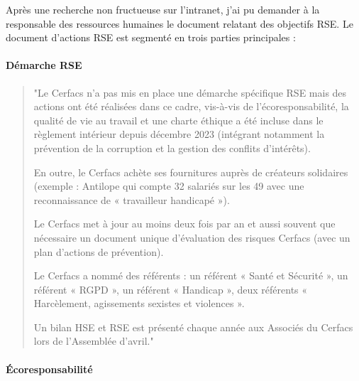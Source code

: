 

Après une recherche non fructueuse sur l'intranet, j'ai pu demander à la responsable des ressources humaines le document relatant des objectifs \ac{RSE}. Le document d'actions RSE est segmenté en trois parties principales :

\paragraph{Démarche RSE}


\begin{quote}
\setlength{\leftmargin}{0.5cm} %
\setlength{\rightmargin}{0.5cm} %
    "Le Cerfacs n’a pas mis en place une démarche spécifique RSE mais des actions ont été réalisées dans
    ce cadre, vis-à-vis de l’écoresponsabilité, la qualité de vie au travail et une charte éthique a été
    incluse dans le règlement intérieur depuis décembre 2023 (intégrant notamment la prévention de la
    corruption et la gestion des conflits d’intérêts).
    \hspace{0,5cm}

    En outre, le Cerfacs achète ses fournitures auprès de créateurs solidaires (exemple : Antilope qui
    compte 32 salariés sur les 49 avec une reconnaissance de « travailleur handicapé »).
    \hspace{0,5cm}

    Le Cerfacs met à jour au moins deux fois par an et aussi souvent que nécessaire un document unique
    d’évaluation des risques Cerfacs (avec un plan d’actions de prévention).
    \hspace{0,5cm}

    Le Cerfacs a nommé des référents : un référent « Santé et Sécurité », un référent « \ac{RGPD} », un
    référent « Handicap », deux référents « Harcèlement, agissements sexistes et violences ».

    Un bilan HSE et RSE est présenté chaque année aux Associés du Cerfacs lors de l’Assemblée d’avril."
\end{quote}



\paragraph{Écoresponsabilité}
\hspace{0,5cm}

